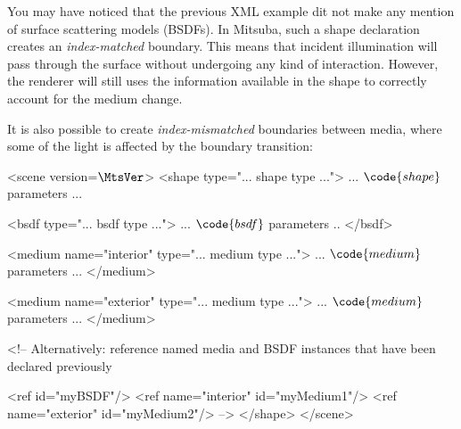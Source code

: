 You may have noticed that the previous XML example dit not make any mention of surface
scattering models (BSDFs). In Mitsuba, such a shape declaration creates an \emph{index-matched} boundary.
This means that incident illumination will pass through the surface without undergoing any kind of 
interaction. However, the renderer will still uses the information available in the shape to correctly 
account for the medium change.

It is also possible to create \emph{index-mismatched} boundaries between media, where some of
the light is affected by the boundary transition:
\begin{xml}
<scene version=$\MtsVer$>
	<shape type="... shape type ...">
	    ... $\code{shape}$ parameters ...

	    <bsdf type="... bsdf type ...">
		    ... $\code{bsdf}$ parameters ..
		</bsdf>

		<medium name="interior" type="... medium type ...">
		    ... $\code{medium}$ parameters ...
		</medium>
		
		<medium name="exterior" type="... medium type ...">
		    ... $\code{medium}$ parameters ...
		</medium>

		<!-- Alternatively: reference named media and BSDF
		     instances that have been declared previously

             <ref id="myBSDF"/>
             <ref name="interior" id="myMedium1"/>
             <ref name="exterior" id="myMedium2"/>
		-->
	</shape>
</scene>
\end{xml}

